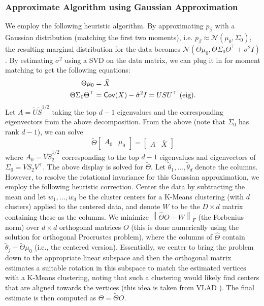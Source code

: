 \documentclass[bj,authoryear]{imsart}
\theoremstyle{plain}
\theoremstyle{remark}
\def\cN{\mathcal{N}}
\def\Cov{{\sf Cov}}
\def\norm#1{\left\|#1\right\|}
\begin{document}
\begin{appendix}
\subsubsection{Approximate Algorithm using Gaussian Approximation}
\label{app:approx_gaussian_algorithm}
We employ the following heuristic algorithm. By approximating $p_{\beta}$ with a Gaussian distribution (matching the first two moments), i.e. $p_{\beta}\approx \cN(\mu_0,\Sigma_0)$, the resulting marginal distribution for the data becomes $\cN(\Theta \mu_0, \Theta\Sigma_0\Theta ^\top+\sigma^2 I)$. By estimating $\sigma^2$ using a SVD on the data matrix, we can plug it in for moment matching to get the following equations:
\begin{align*}
    \Theta\mu_0 &= \bar{X} \\
    \Theta\Sigma_0\Theta^\top &= \Cov(X) - \hat{\sigma}^2 I = USU^\top \text{ (eig)}.
\end{align*}
Let $A=\tilde{U}\tilde{S}^{1/2}$ taking the top $d-1$ eigenvalues and the corresponding eigenvectors from the above decomposition. From the above (note that $\Sigma_0$ has rank $d-1$), we can solve
$$\tilde{\Theta} \begin{bmatrix} A_0 &  \mu_0\end{bmatrix} = \begin{bmatrix} A & \bar{X}\end{bmatrix}$$
where $A_0=\tilde{V}\tilde{S}_2^{1/2}$ corresponding to the top $d-1$ eigenvalues and eigenvectors of $\Sigma_0=VS_2V^\top$. The above display is solved for $\tilde{\Theta}$. Let $\tilde{\theta}_1,\dots,\tilde{\theta}_d$ denote the columns. However, to resolve the rotational invariance for this Gaussian approximation, we employ the following heuristic correction. Center the data by subtracting the mean and let $w_1,\dots,w_d$ be the cluster centers for a K-Means clustering (with $d$ clusters) applied to the centered data, and denote $W$ to be the $D\times d$ matrix containing these as the columns. We minimize $\norm{\hat{\Theta} O - W}_{F}$ (the Forbenius norm) over $d\times d$ orthogonal matrices $O$ (this is done numerically using the solution for orthogonal Procrustes problem), where the columns of $\hat{\Theta}$ contain $\tilde{\theta}_j - \tilde{\Theta}\mu_0$ (i.e., the centered version). Essentially, we center to bring the problem down to the appropriate linear subspace and then the orthogonal matrix estimates a suitable rotation in this subspace to match the estimated vertices with a K-Means clustering, noting that such a clustering would likely find centers that are aligned towards the vertices (this idea is taken from VLAD \cite{yurochkin2019dirichlet}). The final estimate is then computed as $\Theta=\tilde{\Theta}O$.


\end{appendix}
\end{document}
